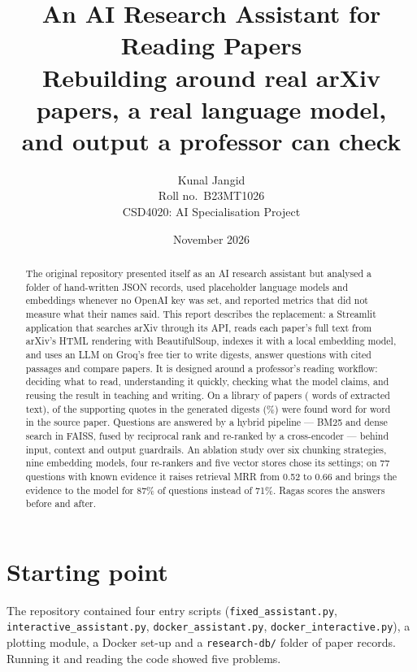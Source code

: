 \documentclass[11pt,a4paper]{article}
\title{\textbf{An AI Research Assistant for Reading Papers}\\[4pt]
\large Rebuilding \code{AI-Research-Assistant-New} around real arXiv papers, a real language model,\\
and output a professor can check}
\author{Kunal Jangid\\
\normalsize Roll no.\ B23MT1026\\[2pt]
\normalsize CSD4020: AI Specialisation Project}
\date{November 2026}
\newcommand{\code}[1]{\texttt{#1}}
\begin{document}
\maketitle

\begin{abstract}
\noindent The original repository presented itself as an AI research assistant but analysed a folder of
hand-written JSON records, used placeholder language models and embeddings whenever no OpenAI key was set,
and reported metrics that did not measure what their names said. This report describes the replacement: a
Streamlit application that searches arXiv through its API, reads each paper's full text from arXiv's HTML
rendering with BeautifulSoup, indexes it with a local embedding model, and uses an LLM on Groq's free tier to
write digests, answer questions with cited passages and compare papers. It is designed around a professor's
reading workflow: deciding what to read, understanding it quickly, checking what the model claims, and
reusing the result in teaching and writing. On a library of \mPapers{} papers (\mWords{} words of extracted
text), \mQuotesVerified{} of the \mQuotes{} supporting quotes in the generated digests (\mQuotesPct\%) were
found word for word in the source paper. Questions are answered by a hybrid pipeline --- BM25 and dense
search in FAISS, fused by reciprocal rank and re-ranked by a cross-encoder --- behind input, context and
output guardrails. An ablation study over six chunking strategies, nine embedding models, four re-rankers
and five vector stores chose its settings; on 77 questions with known evidence it raises retrieval MRR
from 0.52 to 0.66 and brings the evidence to the model for 87\% of questions instead of 71\%. Ragas scores
the answers before and after.
\end{abstract}

\tableofcontents
\bigskip

\section{Starting point}

The repository contained four entry scripts (\code{fixed\_assistant.py}, \code{interactive\_assistant.py},
\code{docker\_assistant.py}, \code{docker\_interactive.py}), a plotting module, a Docker set-up and a
\code{research-db/} folder of paper records. Running it and reading the code showed five problems.
\end{document}
